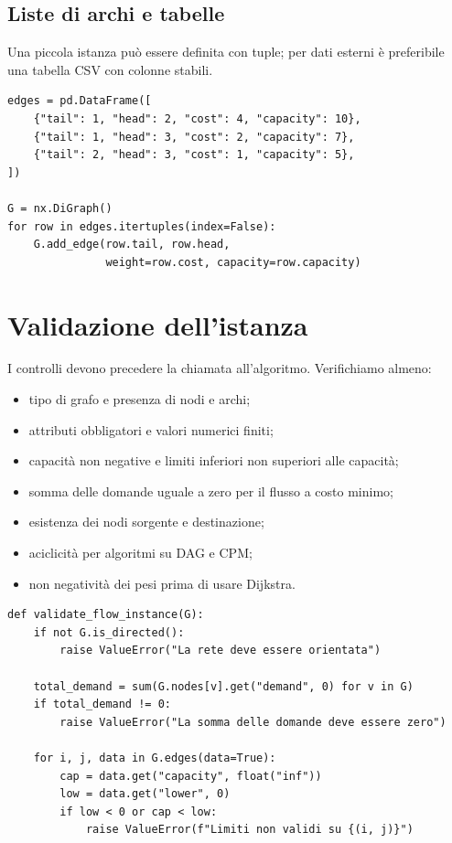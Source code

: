 \documentclass[11pt,a4paper]{article}
\begin{document}
\subsection{Liste di archi e tabelle}
Una piccola istanza può essere definita con tuple; per dati esterni è preferibile una tabella CSV con colonne stabili.
\begin{lstlisting}[style=python,caption={Costruzione da una tabella di archi}]
edges = pd.DataFrame([
    {"tail": 1, "head": 2, "cost": 4, "capacity": 10},
    {"tail": 1, "head": 3, "cost": 2, "capacity": 7},
    {"tail": 2, "head": 3, "cost": 1, "capacity": 5},
])

G = nx.DiGraph()
for row in edges.itertuples(index=False):
    G.add_edge(row.tail, row.head,
               weight=row.cost, capacity=row.capacity)
\end{lstlisting}

\section{Validazione dell'istanza}
I controlli devono precedere la chiamata all'algoritmo. Verifichiamo almeno:
\begin{itemize}
\item tipo di grafo e presenza di nodi e archi;
\item attributi obbligatori e valori numerici finiti;
\item capacità non negative e limiti inferiori non superiori alle capacità;
\item somma delle domande uguale a zero per il flusso a costo minimo;
\item esistenza dei nodi sorgente e destinazione;
\item aciclicità per algoritmi su DAG e CPM;
\item non negatività dei pesi prima di usare Dijkstra.
\end{itemize}

\begin{lstlisting}[style=python,caption={Validatore essenziale per una rete di flusso}]
def validate_flow_instance(G):
    if not G.is_directed():
        raise ValueError("La rete deve essere orientata")

    total_demand = sum(G.nodes[v].get("demand", 0) for v in G)
    if total_demand != 0:
        raise ValueError("La somma delle domande deve essere zero")

    for i, j, data in G.edges(data=True):
        cap = data.get("capacity", float("inf"))
        low = data.get("lower", 0)
        if low < 0 or cap < low:
            raise ValueError(f"Limiti non validi su {(i, j)}")
\end{lstlisting}
\end{document}
